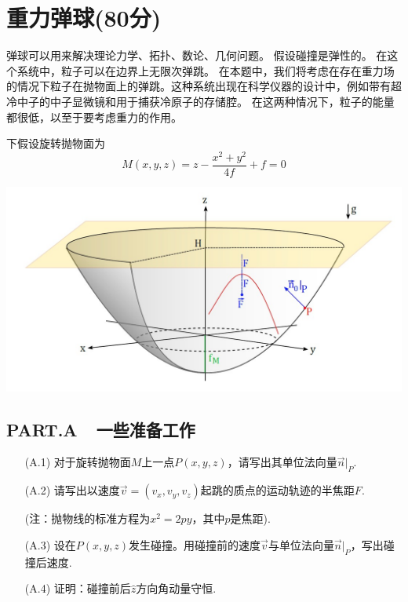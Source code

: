 \documentclass{article}
\begin{document}
\section*{重力弹球(80分)}
弹球可以用来解决理论力学、拓扑、数论、几何问题。 假设碰撞是弹性的。  在这个系统中，粒子可以在边界上无限次弹跳。 在本题中，我们将考虑在存在重力场的情况下粒子在抛物面上的弹跳。这种系统出现在科学仪器的设计中，例如带有超冷中子的中子显微镜和用于捕获冷原子的存储腔。 在这两种情况下，粒子的能量都很低，以至于要考虑重力的作用。 \par
下假设旋转抛物面为
\[
M(x,y,z)=z-\dfrac{x^2+y^2}{4f}+f=0
\]
    \begin{center}
    \includegraphics[scale=0.4]{img/0017.1.jpg}\par
    \end{center}

\subsection*{PART.A\ \ 一些准备工作}
\begin{itemize}
    \item[(A.1)]对于旋转抛物面$M$上一点$P(x,y,z)$，请写出其单位法向量$\vec{n}|_P$.
    \item[(A.2)]请写出以速度$\vec{v}=(v_x,v_y,v_z)$起跳的质点的运动轨迹的半焦距$F$.\par (注：抛物线的标准方程为$x^2=2py$，其中$p$是焦距). 
    \item[(A.3)]设在$P(x,y,z)$发生碰撞。用碰撞前的速度$\vec{v}$与单位法向量$\vec{n}|_P$，写出碰撞后速度.
    \item[(A.4)]证明：碰撞前后$\hat{z}$方向角动量守恒. 
\end{itemize}
\end{document}
